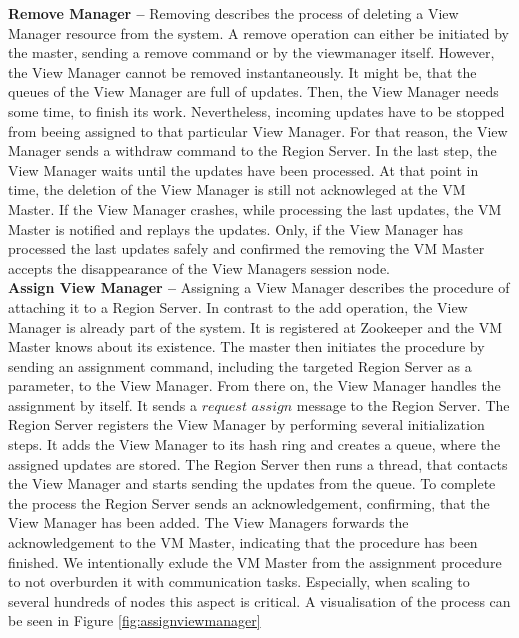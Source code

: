\documentclass[11pt,a4paper,bibtotoc,idxtotoc,headsepline,footsepline,footexclude,BCOR12mm,DIV13]{scrbook}
\begin{document}
\noindent  
\textbf{Remove Manager -- }Removing describes the process of deleting a View Manager resource from the system. A remove operation can either be initiated by the master, sending a remove command or by the viewmanager itself. However, the View Manager cannot be removed instantaneously. It might be, that the queues of the View Manager are full of updates. Then, the View Manager needs some time, to finish its work. Nevertheless, incoming updates have to be stopped from beeing assigned to that particular View Manager. For that reason, the View Manager sends a withdraw command to the Region Server. In the last step, the View Manager waits until the updates have been processed. At that point in time, the deletion of the View Manager is still not acknowleged at the VM Master. If the View Manager crashes, while processing the last updates, the VM Master is notified and replays the updates. Only, if the View Manager has processed the last updates safely and confirmed the removing the VM Master accepts the disappearance of the View Managers session node.\\ 

\noindent  
\textbf{Assign View Manager -- }Assigning a View Manager describes the procedure of attaching it to a Region Server. In contrast to the add operation, the View Manager is already part of the system. It is registered at Zookeeper and the VM Master knows about its existence. The master then initiates the procedure by sending an assignment command, including the targeted Region Server as a parameter, to the View Manager. From there on, the View Manager handles the assignment by itself. It sends a $request$  $assign$ message to the Region Server. The Region Server registers the View Manager by performing several initialization steps. It adds the View Manager to its hash ring and creates a queue, where the assigned updates are stored. The Region Server then runs a thread, that contacts the View Manager and starts sending the updates from the queue. To complete the process the Region Server sends an acknowledgement, confirming, that the View Manager has been added. The View Managers forwards the acknowledgement to the VM Master, indicating that the procedure has been finished. We intentionally exlude the VM Master from the  assignment procedure to not overburden it with communication tasks. Especially, when scaling to several hundreds of nodes this aspect is critical. A visualisation of the process can be seen in Figure \ref{fig:assignviewmanager}\\
 
\end{document}
